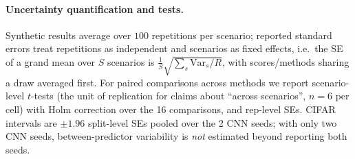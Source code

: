 \paragraph{Uncertainty quantification and tests.} Synthetic results average over $100$ repetitions per scenario; reported standard errors treat repetitions as independent and scenarios as fixed effects, i.e.\ the SE of a grand mean over $S$ scenarios is $\frac1S\sqrt{\sum_s \mathrm{Var}_s/R}$, with scores/methods sharing a draw averaged first. For paired comparisons across methods we report scenario-level $t$-tests (the unit of replication for claims about ``across scenarios'', $n=6$ per cell) with Holm correction over the 16 comparisons, and rep-level SEs. CIFAR intervals are $\pm1.96$ split-level SEs pooled over the 2 CNN seeds; with only two CNN seeds, between-predictor variability is \emph{not} estimated beyond reporting both seeds.
